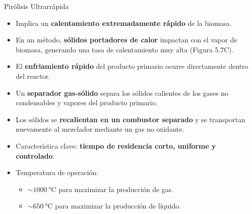 \documentclass[../../main.tex]{subfiles}
\begin{document}
\begin{frame}{Pirólisis Ultrarrápida}
\small
\begin{itemize}
  \item Implica un \textbf{calentamiento extremadamente rápido} de la biomasa.
  \item En un método, \textbf{sólidos portadores de calor} impactan con el vapor de biomasa, generando una tasa de calentamiento muy alta (Figura 5.7C).
  \item El \textbf{enfriamiento rápido} del producto primario ocurre directamente dentro del reactor.
  \item Un \textbf{separador gas-sólido} separa los sólidos calientes de los gases no condensables y vapores del producto primario.
  \item Los sólidos se \textbf{recalientan en un combustor separado} y se transportan nuevamente al mezclador mediante un gas no oxidante.
  \item Característica clave: \textbf{tiempo de residencia corto, uniforme y controlado}.
  \item Temperatura de operación:
  \begin{itemize}
    \item \textbf{$\sim \SI{1000}{\degreeCelsius}$} para maximizar la producción de gas.
    \item \textbf{$\sim \SI{650}{\degreeCelsius}$} para maximizar la producción de líquido.
  \end{itemize}
\end{itemize}
\end{frame}
\end{document}
